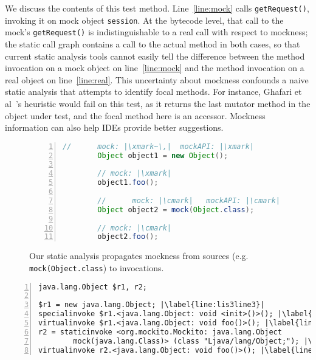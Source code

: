 We discuss the contents of this test method. Line~\ref{line:mock} calls \texttt{getRequest()}, invoking it on mock object \texttt{session}. At the bytecode level, that call to the mock's \texttt{getRequest()} is indistinguishable to a real call with respect to mockness; the static call graph contains a call to the actual method in both cases, so that current static analysis tools cannot easily tell the difference between the method invocation on a mock object on line~\ref{line:mock} and the method invocation on a real object on line~\ref{line:real}. This uncertainty about mockness confounds a naive static analysis that attempts to identify focal methods. For instance, Ghafari et al~\cite{ghafari15:_autom}'s heuristic would fail on this test, as it returns the last mutator method in the object under test, and the focal method here is an accessor. Mockness information can also help IDEs provide better suggestions. 

\begin{figure}[ht]
        \begin{lstlisting}[basicstyle=\ttfamily,
        numbers=left,numbersep=0pt,basicstyle=\scriptsize\ttfamily,language = Java, framesep=4.5mm, framexleftmargin=1.0mm, captionpos=b, escapechar=|, morekeywords={@Test}]
        //      mock: |\xmark~\,|  mockAPI: |\xmark|
        Object object1 = new Object();
        
        // mock: |\xmark|
        object1.foo();
        
        //      mock: |\cmark|   mockAPI: |\cmark|
        Object object2 = mock(Object.class);
        
        // mock: |\cmark|
        object2.foo();
        \end{lstlisting}
        \caption{Our static analysis propagates mockness from sources (e.g. \texttt{mock(Object.class}) to invocations.}
        \label{fig:mockMethodIllustration}
        
\end{figure}

\begin{lstlisting}[basicstyle=\ttfamily, caption={Jimple Intermediate Representation for some code in Figure~\ref{fig:mockMethodIllustration}
.},
numbers=left,numbersep=2pt,basicstyle=\scriptsize\ttfamily, captionpos=b, label=lis:mockMethodIllustrationIR, escapechar=|, morekeywords={@T
est, specialinvoke, virtualinvoke, staticinvoke}]
java.lang.Object $r1, r2;

$r1 = new java.lang.Object; |\label{line:lis3line3}|
specialinvoke $r1.<java.lang.Object: void <init>()>(); |\label{line:lis3line4}|
virtualinvoke $r1.<java.lang.Object: void foo()>(); |\label{line:lis3line5}|
r2 = staticinvoke <org.mockito.Mockito: java.lang.Object
        mock(java.lang.Class)> (class "Ljava/lang/Object;"); |\label{line:lis3line6}|
virtualinvoke r2.<java.lang.Object: void foo()>(); |\label{line:lis3line9}|
\end{lstlisting}


